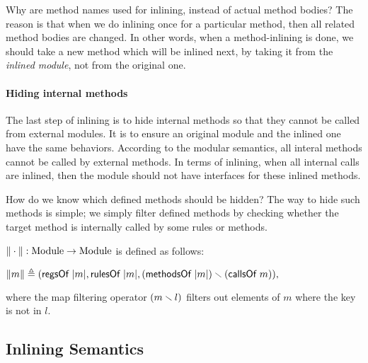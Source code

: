 Why are method names used for inlining, instead of actual method
bodies? The reason is that when we do inlining once for a particular
method, then all related method bodies are changed. In other words,
when a method-inlining is done, we should take a new method which will
be inlined next, by taking it from the \emph{inlined module}, not from
the original one.

\paragraph{Hiding internal methods}

The last step of inlining is to hide internal methods so that they
cannot be called from external modules. It is to ensure an original
module and the inlined one have the same behaviors. According to the
modular semantics, all interal methods cannot be called by external
methods. In terms of inlining, when all internal calls are inlined,
then the module should not have interfaces for these inlined methods.

How do we know which defined methods should be hidden? The way to hide
such methods is simple; we simply filter defined methods by checking
whether the target method is internally called by some rules or
methods.

\begin{definition}
  \label{def-inlineF}
  $\| \cdot \| : \textrm{Module} \to \textrm{Module}$ is defined
  as follows:
  \begin{center}
    \begin{math}
      \| m \| \triangleq
      (\textsf{regsOf}\ | m |,
      \textsf{rulesOf}\ | m |,
      (\textsf{methodsOf}\ | m |) \smallsetminus{} (\textsf{callsOf}\ m)),
    \end{math}
  \end{center}
\end{definition}
where the map filtering operator $(m \smallsetminus{} l)$ filters out
elements of $m$ where the key is not in $l$.

\subsection{Inlining Semantics}

